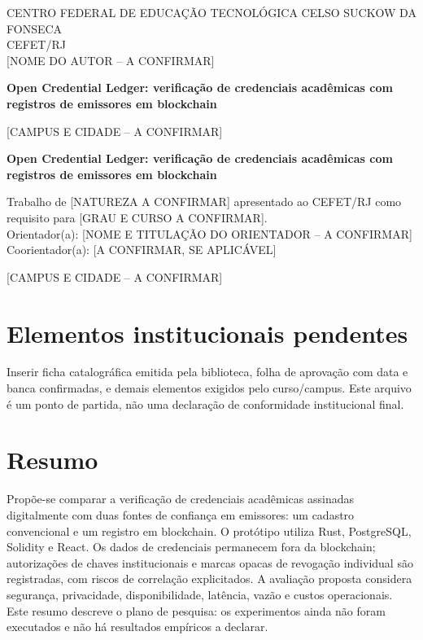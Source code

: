 \documentclass[12pt,a4paper,oneside]{report}
\newcommand{\autor}{[NOME DO AUTOR -- A CONFIRMAR]}
\newcommand{\orientador}{[NOME E TITULAÇÃO DO ORIENTADOR -- A CONFIRMAR]}
\newcommand{\curso}{[CURSO -- A CONFIRMAR]}
\newcommand{\campus}{[CAMPUS E CIDADE -- A CONFIRMAR]}
\newcommand{\titulo}{Open Credential Ledger: verificação de credenciais acadêmicas com registros de emissores em blockchain}
\begin{document}
\begin{titlepage}\centering
CENTRO FEDERAL DE EDUCAÇÃO TECNOLÓGICA CELSO SUCKOW DA FONSECA\\CEFET/RJ\\\curso
\vspace{3cm}
\autor
\vfill
{\Large\bfseries\titulo\par}
\vfill
\campus\\[ANO DE ENTREGA -- A CONFIRMAR]
\end{titlepage}
\begin{titlepage}\centering
\autor\vfill
{\Large\bfseries\titulo\par}\vspace{2cm}
\begin{flushright}\begin{minipage}{0.55\textwidth}\singlespacing
Trabalho de [NATUREZA A CONFIRMAR] apresentado ao CEFET/RJ como requisito para [GRAU E CURSO A CONFIRMAR].\\
Orientador(a): \orientador\\
Coorientador(a): [A CONFIRMAR, SE APLICÁVEL]
\end{minipage}\end{flushright}\vfill
\campus\\[ANO A CONFIRMAR]
\end{titlepage}
\chapter*{Elementos institucionais pendentes}
Inserir ficha catalográfica emitida pela biblioteca, folha de aprovação com data e banca confirmadas, e demais elementos exigidos pelo curso/campus. Este arquivo é um ponto de partida, não uma declaração de conformidade institucional final.
\chapter*{Resumo}
Propõe-se comparar a verificação de credenciais acadêmicas assinadas digitalmente com duas fontes de confiança em emissores: um cadastro convencional e um registro em blockchain. O protótipo utiliza Rust, PostgreSQL, Solidity e React. Os dados de credenciais permanecem fora da blockchain; autorizações de chaves institucionais e marcas opacas de revogação individual são registradas, com riscos de correlação explicitados. A avaliação proposta considera segurança, privacidade, disponibilidade, latência, vazão e custos operacionais. Este resumo descreve o plano de pesquisa: os experimentos ainda não foram executados e não há resultados empíricos a declarar.
\end{document}
